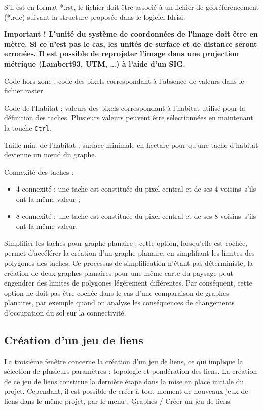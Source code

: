 \documentclass{article}
\begin{document}
S’il est en format *.rst, le fichier doit être associé à un fichier de géoréférencement (*.rdc) suivant la structure proposée dans le logiciel Idrisi.

\textbf{Important ! L’unité du système de coordonnées de l’image doit être en mètre. Si ce n’est pas le cas, les unités de surface et de distance seront erronées. Il est possible de reprojeter l’image dans une projection métrique (Lambert93, UTM, …) à l’aide d’un SIG.}

Code hors zone : code des pixels correspondant à l’absence de valeurs dans le fichier raster.

Code de l’habitat : valeurs des pixels correspondant à l’habitat utilisé pour la définition des taches. Plusieurs valeurs peuvent être sélectionnées en maintenant la touche \verb|Ctrl|.

Taille min. de l’habitat : surface minimale en hectare pour qu’une tache d’habitat devienne un nœud du graphe.

Connexité des taches :
\begin{itemize}
	\item 4-connexité : une tache est constituée du pixel central et de ses 4 voisins~s’ils ont la même valeur ;
	\item 8-connexité : une tache est constituée du pixel central et de ses 8 voisins~s’ils ont la même valeur.
\end{itemize}

Simplifier les taches pour graphe planaire : cette option, lorsqu’elle est cochée, permet d’accélérer la création d’un graphe planaire, en simplifiant les limites des polygones des taches. Ce processus de simplification n’étant pas déterministe, la création de deux graphes planaires pour une même carte du paysage peut engendrer des limites de polygones légèrement différentes. Par conséquent, cette option ne doit pas être cochée dans le cas d’une comparaison de graphes planaires, par exemple quand on analyse les conséquences de changements d'occupation du sol sur la connectivité.

\subsection{Création d’un jeu de liens}
\label{linkset}
La troisième fenêtre concerne la création d’un jeu de liens, ce qui implique la sélection de plusieurs paramètres : topologie et pondération des liens. La création de ce jeu de liens constitue la dernière étape dans la mise en place initiale du projet. Cependant, il est possible de créer à tout moment de nouveaux jeux de liens dans le même projet, par le menu : Graphes / Créer un jeu de liens.
\end{document}
